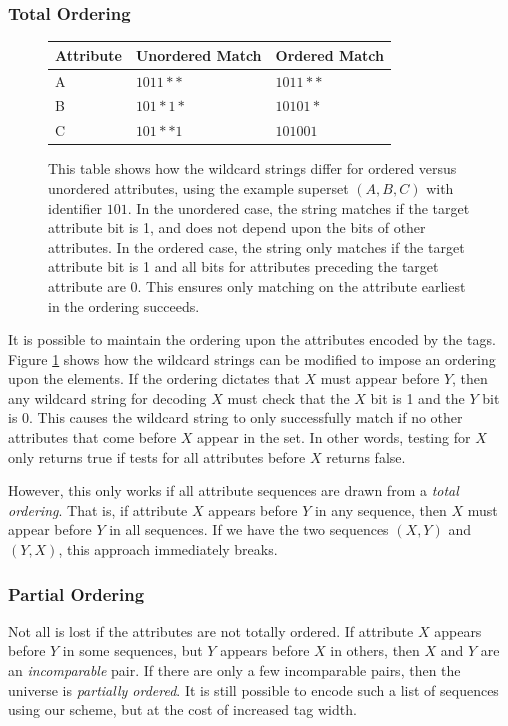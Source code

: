 \subsubsection{Total Ordering}
\begin{figure}
    \begin{tabular}{| l | l | l |}
    \hline
    Attribute & Unordered Match & Ordered Match\\ \hline
    A & $1011**$ & $1011**$ \\ \hline
    B & $101*1*$ & $10101*$ \\ \hline
    C & $101**1$ & $101001$ \\
    \hline
    \end{tabular}
    \caption{This table shows how the wildcard strings differ for ordered versus unordered attributes, using the example superset $(A,B,C)$ with identifier $101$. In the unordered case, the string matches if the target attribute bit is 1, and does not depend upon the bits of other attributes. In the ordered case, the string only matches if the target attribute bit is 1 and all bits for attributes preceding the target attribute are 0. This ensures only matching on the attribute earliest in the ordering succeeds.} 
    \label{tab:ordering}
\end{figure}
It is possible to maintain the ordering upon the attributes encoded by the tags. Figure \ref{tab:ordering} shows how the wildcard strings can be modified to impose an ordering upon the elements. If the ordering dictates that $X$ must appear before $Y$, then any wildcard string for decoding $X$ must check that the $X$ bit is 1 and the $Y$ bit is 0. This causes the wildcard string to only successfully match if no other attributes that come before $X$ appear in the set. In other words, testing for $X$ only returns true if tests for all attributes before $X$ returns false. 

However, this only works if all attribute sequences are drawn from a \textit{total ordering}. That is, if attribute $X$ appears before $Y$ in any sequence, then $X$ must appear before $Y$ in all sequences. If we have the two sequences $(X, Y)$ and $(Y, X)$, this approach immediately breaks.

\subsubsection{Partial Ordering}
Not all is lost if the attributes are not totally ordered. If attribute $X$ appears before $Y$ in some sequences, but $Y$ appears before $X$ in others, then $X$ and $Y$ are an \textit{incomparable} pair. If there are only a few incomparable pairs, then the universe is \textit{partially ordered}. It is still possible to encode such a list of sequences using our scheme, but at the cost of increased tag width.

